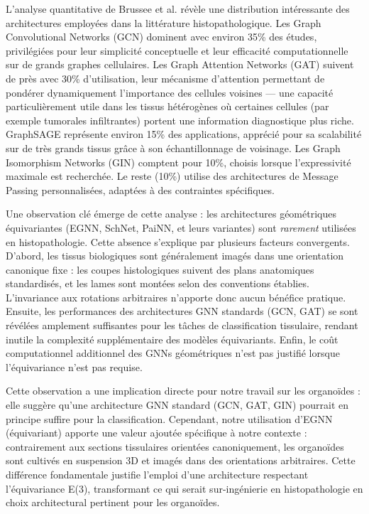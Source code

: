 L'analyse quantitative de Brussee et al. révèle une distribution intéressante des architectures employées dans la littérature histopathologique. Les Graph Convolutional Networks (GCN) dominent avec environ 35\% des études, privilégiées pour leur simplicité conceptuelle et leur efficacité computationnelle sur de grands graphes cellulaires. Les Graph Attention Networks (GAT) suivent de près avec 30\% d'utilisation, leur mécanisme d'attention permettant de pondérer dynamiquement l'importance des cellules voisines — une capacité particulièrement utile dans les tissus hétérogènes où certaines cellules (par exemple tumorales infiltrantes) portent une information diagnostique plus riche. GraphSAGE représente environ 15\% des applications, apprécié pour sa scalabilité sur de très grands tissus grâce à son échantillonnage de voisinage. Les Graph Isomorphism Networks (GIN) comptent pour 10\%, choisis lorsque l'expressivité maximale est recherchée. Le reste (10\%) utilise des architectures de Message Passing personnalisées, adaptées à des contraintes spécifiques.

Une observation clé émerge de cette analyse : les architectures géométriques équivariantes (EGNN, SchNet, PaiNN, et leurs variantes) sont \textit{rarement} utilisées en histopathologie. Cette absence s'explique par plusieurs facteurs convergents. D'abord, les tissus biologiques sont généralement imagés dans une orientation canonique fixe : les coupes histologiques suivent des plans anatomiques standardisés, et les lames sont montées selon des conventions établies. L'invariance aux rotations arbitraires n'apporte donc aucun bénéfice pratique. Ensuite, les performances des architectures GNN standards (GCN, GAT) se sont révélées amplement suffisantes pour les tâches de classification tissulaire, rendant inutile la complexité supplémentaire des modèles équivariants. Enfin, le coût computationnel additionnel des GNNs géométriques n'est pas justifié lorsque l'équivariance n'est pas requise.

Cette observation a une implication directe pour notre travail sur les organoïdes : elle suggère qu'une architecture GNN standard (GCN, GAT, GIN) pourrait en principe suffire pour la classification. Cependant, notre utilisation d'EGNN (équivariant) apporte une valeur ajoutée spécifique à notre contexte : contrairement aux sections tissulaires orientées canoniquement, les organoïdes sont cultivés en suspension 3D et imagés dans des orientations arbitraires. Cette différence fondamentale justifie l'emploi d'une architecture respectant l'équivariance E(3), transformant ce qui serait sur-ingénierie en histopathologie en choix architectural pertinent pour les organoïdes.

